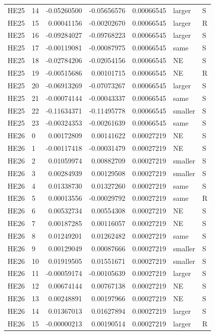 \documentclass[11pt]{article}
\begin{document}
{\begin{longtable}{llrrrll}
HE25 & 14 & -0.05260500 & -0.05656576 & 0.00066545 & larger & S\\
HE25 & 15 & 0.00041156 & -0.00202670 & 0.00066545 & larger & R\\
HE25 & 16 & -0.09284027 & -0.09768223 & 0.00066545 & larger & S\\
HE25 & 17 & -0.00119081 & -0.00087975 & 0.00066545 & same & S\\
HE25 & 18 & -0.02784206 & -0.02054156 & 0.00066545 & NE & S\\
HE25 & 19 & -0.00515686 & 0.00101715 & 0.00066545 & NE & R\\
HE25 & 20 & -0.06913269 & -0.07073267 & 0.00066545 & larger & S\\
HE25 & 21 & -0.00074144 & -0.00043337 & 0.00066545 & same & S\\
HE25 & 22 & -0.11634371 & -0.11495778 & 0.00066545 & smaller & S\\
HE25 & 23 & -0.00324353 & -0.00261639 & 0.00066545 & same & S\\
HE26 & 0 & 0.00172809 & 0.00141622 & 0.00027219 & NE & S\\
HE26 & 1 & -0.00117418 & -0.00031479 & 0.00027219 & NE & S\\
HE26 & 2 & 0.01059974 & 0.00882709 & 0.00027219 & smaller & S\\
HE26 & 3 & 0.00284939 & 0.00129508 & 0.00027219 & smaller & S\\
HE26 & 4 & 0.01338730 & 0.01327260 & 0.00027219 & same & S\\
HE26 & 5 & 0.00013556 & -0.00029792 & 0.00027219 & same & R\\
HE26 & 6 & 0.00532734 & 0.00554308 & 0.00027219 & NE & S\\
HE26 & 7 & 0.00187285 & 0.00116057 & 0.00027219 & NE & S\\
HE26 & 8 & 0.01249201 & 0.01262482 & 0.00027219 & same & S\\
HE26 & 9 & 0.00129049 & 0.00087666 & 0.00027219 & smaller & S\\
HE26 & 10 & 0.01919505 & 0.01551671 & 0.00027219 & smaller & S\\
HE26 & 11 & -0.00059174 & -0.00105639 & 0.00027219 & larger & S\\
HE26 & 12 & 0.00674144 & 0.00767138 & 0.00027219 & NE & S\\
HE26 & 13 & 0.00248891 & 0.00197966 & 0.00027219 & NE & S\\
HE26 & 14 & 0.01367013 & 0.01627894 & 0.00027219 & larger & S\\
HE26 & 15 & -0.00000213 & 0.00190514 & 0.00027219 & larger & R\\

\end{longtable}}
\end{document}
